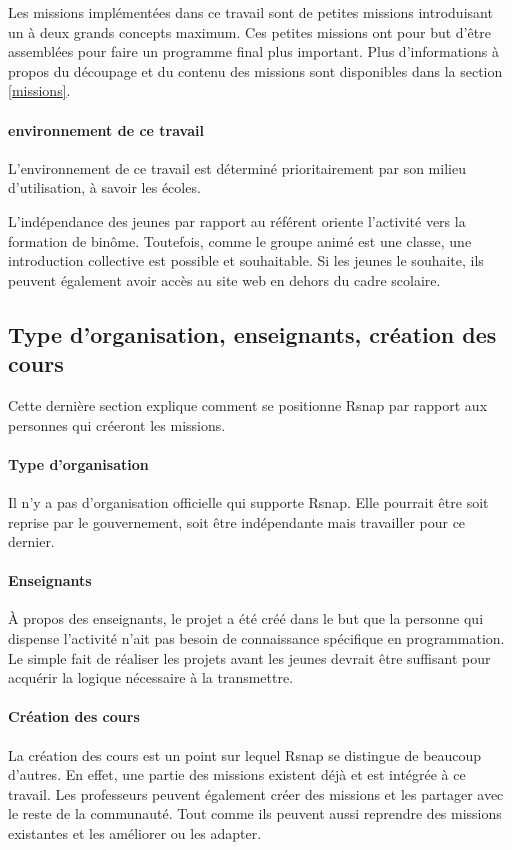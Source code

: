 Les missions implémentées dans ce travail sont de petites missions introduisant un à deux grands concepts maximum. Ces petites missions ont pour but d'être assemblées pour faire un programme final plus important. Plus d'informations à propos du découpage et du contenu des missions sont disponibles dans la section \ref{missions}.

\paragraph{environnement de ce travail}
L'environnement de ce travail est déterminé prioritairement par son milieu d'utilisation, à savoir les écoles. 

L'indépendance des jeunes par rapport au référent oriente l'activité vers la formation de binôme. Toutefois, comme le groupe animé est une classe, une introduction collective est possible et souhaitable. 
Si les jeunes le souhaite, ils peuvent également avoir accès au site web en dehors du cadre scolaire.

\subsection{Type d'organisation, enseignants, création des cours}
Cette dernière section explique comment se positionne Rsnap par rapport aux personnes qui créeront les missions.

\paragraph{Type d'organisation}
Il n'y a pas d'organisation officielle qui supporte Rsnap. Elle pourrait être soit reprise par le gouvernement, soit être indépendante mais travailler pour ce dernier.

\paragraph{Enseignants}
À propos des enseignants, le projet a été créé dans le but que la personne qui dispense l'activité n'ait pas besoin de connaissance spécifique en programmation. Le simple fait de réaliser les projets avant les jeunes devrait être suffisant pour acquérir la logique nécessaire à la transmettre.

\paragraph{Création des cours}
La création des cours est un point sur lequel Rsnap se distingue de beaucoup d'autres. En effet, une partie des missions existent déjà et est intégrée à ce travail. Les professeurs peuvent également créer des missions et les partager avec le reste de la communauté. Tout comme ils peuvent aussi reprendre des missions existantes et les améliorer ou les adapter.

